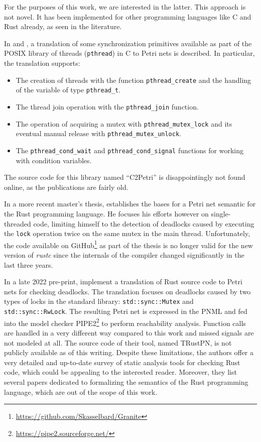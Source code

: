 For the purposes of this work, we are interested in the latter.
This approach is not novel.
It has been implemented for other programming languages like C and Rust already,
as seen in the literature.

In \cite{kavi2002modeling} and \cite{moshtaghi2001},
a translation of some synchronization primitives available as part of
the POSIX library of threads (\texttt{pthread}) in C to Petri nets is described.
In particular, the translation supports:

\begin{itemize}
      \item The creation of threads with the function \texttt{pthread\_create}
            and the handling of the variable of type \texttt{pthread\_t}.
      \item The thread join operation with the \texttt{pthread\_join} function.
      \item The operation of acquiring a mutex with \texttt{pthread\_mutex\_lock}
            and its eventual manual release with \texttt{pthread\_mutex\_unlock}.
      \item The \texttt{pthread\_cond\_wait} and \texttt{pthread\_cond\_signal} functions
            for working with condition variables.
\end{itemize}

The source code for this library named ``C2Petri'' is disappointingly not found online,
as the publications are fairly old.

In a more recent master's thesis, \cite{meyer2020} establishes
the bases for a Petri net semantic for the Rust programming language.
He focuses his efforts however on single-threaded code,
limiting himself to the detection of deadlocks caused by
executing the \texttt{lock} operation twice on the same mutex in the main thread.
Unfortunately, the code available on GitHub\footnote{\url{https://github.com/Skasselbard/Granite}}
as part of the thesis is no longer valid for the new version of \emph{rustc}
since the internals of the compiler changed significantly in the last three years.

In a late 2022 pre-print, \cite{zhang2022deadlocks} implement a translation
of Rust source code to Petri nets for checking deadlocks.
The translation focuses on deadlocks caused by two types of locks
in the standard library: \texttt{std::sync::Mutex} and \texttt{std::sync::RwLock}.
The resulting Petri net is expressed in the \acrfull{PNML}
and fed into the model checker \acrfull{PIPE2}\footnote{\url{https://pipe2.sourceforge.net/}}
to perform reachability analysis.
Function calls are handled in a very different way compared to this work and
missed signals are not modeled at all.
The source code of their tool, named TRustPN, is not publicly available as of this writing.
Despite these limitations, the authors offer a very detailed and up-to-date survey
of static analysis tools for checking Rust code,
which could be appealing to the interested reader.
Moreover, they list several papers dedicated to
formalizing the semantics of the Rust programming language,
which are out of the scope of this work.